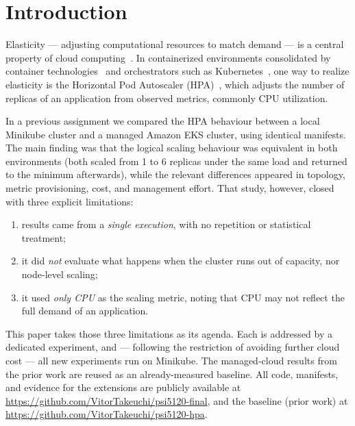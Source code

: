\documentclass[conference]{IEEEtran}
\begin{document}
\section{Introduction}
Elasticity --- adjusting computational resources to match demand --- is a central
property of cloud computing~\cite{catillo2022,galante2012}. In containerized
environments consolidated by container technologies~\cite{bernstein2014} and
orchestrators such as Kubernetes~\cite{burns2016}, one way to realize elasticity
is the Horizontal Pod Autoscaler (HPA)~\cite{k8s-hpa-doc,nguyen2020}, which
adjusts the number of replicas of an application from observed metrics, commonly
CPU utilization.

In a previous assignment we compared the HPA behaviour between a local Minikube
cluster and a managed Amazon EKS cluster, using identical manifests. The main
finding was that the logical scaling behaviour was equivalent in both
environments (both scaled from 1 to 6 replicas under the same load and returned
to the minimum afterwards), while the relevant differences appeared in topology,
metric provisioning, cost, and management effort. That study, however, closed
with three explicit limitations:

\begin{enumerate}
  \item results came from a \emph{single execution}, with no repetition or
        statistical treatment;
  \item it did \emph{not} evaluate what happens when the cluster runs out of
        capacity, nor node-level scaling;
  \item it used \emph{only CPU} as the scaling metric, noting that CPU may not
        reflect the full demand of an application.
\end{enumerate}

This paper takes those three limitations as its agenda. Each is addressed by a
dedicated experiment, and --- following the restriction of avoiding further cloud
cost --- all new experiments run on Minikube. The managed-cloud results from the
prior work are reused as an already-measured baseline. All code, manifests, and
evidence for the extensions are publicly available at
\url{https://github.com/VitorTakeuchi/psi5120-final}, and the baseline (prior
work) at \url{https://github.com/VitorTakeuchi/psi5120-hpa}.
\end{document}
